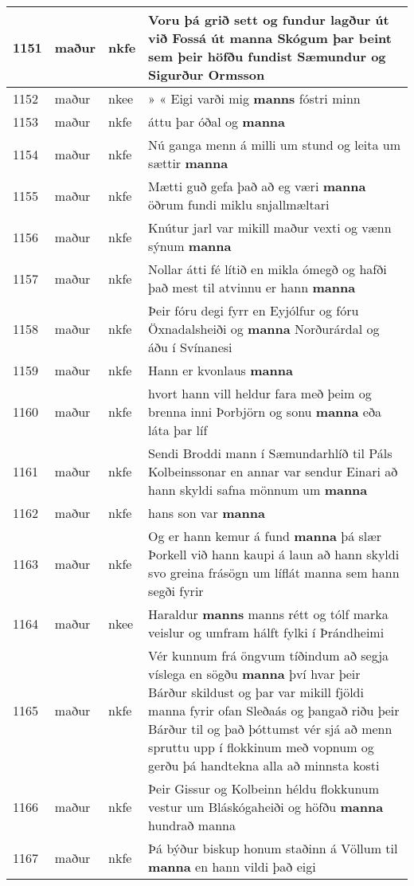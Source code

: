 \documentclass{article}
\begin{document}
\begin{longtable}{p{1cm}|p{1cm}|p{1cm}|p{13cm}}
\hline
1151&maður&nkfe&Voru þá grið sett og fundur lagður út við Fossá út \textbf{manna} Skógum þar beint sem þeir höfðu fundist Sæmundur og Sigurður Ormsson\\
\hline
1152&maður&nkee&» « Eigi varði mig \textbf{manns} fóstri minn\\
\hline
1153&maður&nkfe&áttu þar óðal og \textbf{manna} \\
\hline
1154&maður&nkfe&Nú ganga menn á milli um stund og leita um sættir \textbf{manna} \\
\hline
1155&maður&nkfe&Mætti guð gefa það að eg væri \textbf{manna} öðrum fundi miklu snjallmæltari\\
\hline
1156&maður&nkfe&Knútur jarl var mikill maður vexti og vænn sýnum \textbf{manna} \\
\hline
1157&maður&nkfe&Nollar átti fé lítið en mikla ómegð og hafði það mest til atvinnu er hann \textbf{manna} \\
\hline
1158&maður&nkfe&Þeir fóru degi fyrr en Eyjólfur og fóru Öxnadalsheiði og \textbf{manna} Norðurárdal og áðu í Svínanesi\\
\hline
1159&maður&nkfe&Hann er kvonlaus \textbf{manna} \\
\hline
1160&maður&nkfe&hvort hann vill heldur fara með þeim og brenna inni Þorbjörn og sonu \textbf{manna} eða láta þar líf\\
\hline
1161&maður&nkfe&Sendi Broddi mann í Sæmundarhlíð til Páls Kolbeinssonar en annar var sendur Einari að hann skyldi safna mönnum um \textbf{manna} \\
\hline
1162&maður&nkfe&hans son var \textbf{manna} \\
\hline
1163&maður&nkfe&Og er hann kemur á fund \textbf{manna} þá slær Þorkell við hann kaupi á laun að hann skyldi svo greina frásögn um líflát manna sem hann segði fyrir\\
\hline
1164&maður&nkee&Haraldur \textbf{manns} manns rétt og tólf marka veislur og umfram hálft fylki í Þrándheimi\\
\hline
1165&maður&nkfe&Vér kunnum frá öngvum tíðindum að segja víslega en sögðu \textbf{manna} því hvar þeir Bárður skildust og þar var mikill fjöldi manna fyrir ofan Sleðaás og þangað riðu þeir Bárður til og það þóttumst vér sjá að menn spruttu upp í flokkinum með vopnum og gerðu þá handtekna alla að minnsta kosti\\
\hline
1166&maður&nkfe&Þeir Gissur og Kolbeinn héldu flokkunum vestur um Bláskógaheiði og höfðu \textbf{manna} hundrað manna\\
\hline
1167&maður&nkfe&Þá býður biskup honum staðinn á Völlum til \textbf{manna} en hann vildi það eigi\\

\end{longtable}
\end{document}
